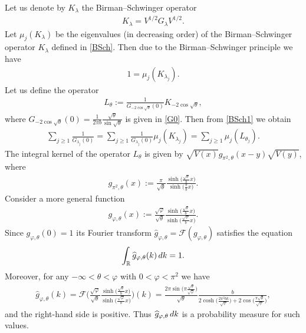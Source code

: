 \documentclass[11pt]{article}
\numberwithin{equation}{section}
\numberwithin{equation}{section}
\begin{document}
Let us denote by $K_\lambda$ the Birman--Schwinger operator
\begin{gather}\label{BSch}
K_\lambda = V^{1/2} G_\lambda V^{1/2}.
\end{gather}
Let $\mu_j(K_\lambda)$ be the eigenvalues (in decreasing order) of the Birman--Schwinger operator $K_\lambda$ defined in \eqref{BSch}.
Then due to the Birman--Schwinger principle we have
\begin{gather}\label{BSch1}
1 = \mu_j(K_{\lambda_j}).
\end{gather}
Let us define the operator
\begin{gather*}%
L_{\theta}:=\frac{1}{G_{-2\cos\sqrt{\theta}}(0)} K_{-2\cos\sqrt{\theta}} ,
\end{gather*}
where $G_{-2\cos\sqrt{\theta}}(0) =\frac{1}{2\pi b}\frac{\sqrt{\theta}}{\sin\sqrt{\theta}}$ is given in \eqref{G0}.
Then from \eqref{BSch1} we obtain
\begin{gather*}
\sum_{j\ge 1} \frac{1}{G_{\lambda_j}(0)}
=\sum_{j\ge 1} \frac{1}{G_{\lambda_j}(0)} \mu_j(K_{\lambda_j})=\sum_{j\ge 1}\mu_j(L_{\theta_j}).
\end{gather*}
The integral kernel of the operator $L_\theta$ is given by $\sqrt{V(x)}g_{\pi^2,\theta}(x-y)\sqrt{V(y)}$, where
\begin{gather*}
g_{\pi^2,\theta}(x):=
\frac{\pi}{\sqrt{\theta}}\frac{\sinh \big(\frac{\sqrt{\theta}}{b}x\big)}{\sinh \big(\frac{\pi}{b}x\big)}.
\end{gather*}
Consider a more general function
\begin{gather*}
g_{\varphi,\theta}(x):=
\frac{\sqrt\varphi}{\sqrt{\theta}}\frac{\sinh \big(\frac{\sqrt{\theta}}{b}x\big)}{\sinh \big(\frac{\sqrt\varphi}{b}x\big)}.
\end{gather*}
Since $g_{\varphi,\theta}(0)=1$ its Fourier transform
$\widehat{g}_{\varphi,\theta} = \mathcal{F} (g_{\varphi,\theta})$ satisfies the equation
\begin{gather*}
\int_{\mathbb R} \widehat{g}_{\varphi,\theta}(k) \, {\rm d} k = 1.
\end{gather*}
Moreover, for any $-\infty<\theta <\varphi$ with $0<\varphi <\pi^2$ we have
\begin{gather*}
 \widehat{g}_{\varphi,\theta}(k) = \mathcal{F} \Bigg(\frac{\sqrt\varphi}{\sqrt{\theta}} \frac{\sinh\big(\frac{\sqrt{\theta}}{b}x\big)}{\sinh\big(\frac{\sqrt\varphi}{b}x\big)}\Bigg)(k)
 = \frac{2\pi \sin\big(\pi \frac{\sqrt\theta}{\sqrt\varphi}\big)}{\sqrt\theta} \frac{b}{2\cosh \big(\frac{2\pi^2 b k}{\sqrt\varphi}\big) + 2\cos\big(\frac{\pi\sqrt\theta}{\sqrt\varphi}\big)},
\end{gather*}
and the right-hand side is positive. Thus $\widehat{g}_{\varphi,\theta}\, {\rm d} k$ is a probability measure for such values.
\end{document}
